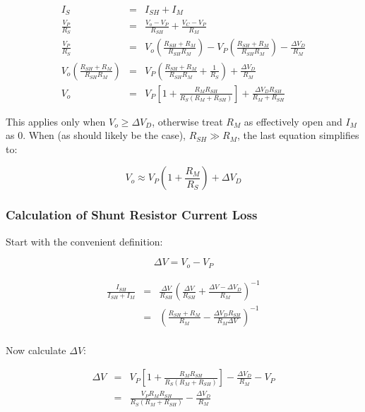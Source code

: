 \documentclass[../PaulGanssle-Thesis.tex]{subfiles}
\begin{document}
\begin{eqnarray}
I_S & = & I_{SH} + I_{M} \\
\frac{V_P}{R_S} & = & \frac{V_o - V_P}{R_{SH}} + \frac{V_C - V_P}{R_M}\\
\frac{V_P}{R_S} & = & V_o\left(\frac{R_{SH} + R_{M}}{R_{SH}R_{M}}\right) - V_P\left(\frac{R_{SH} + R_{M}}{R_{SH}R_{M}}\right) - \frac{\Delta V_D}{R_{M}} \\
V_o\left(\frac{R_{SH} + R_{M}}{R_{SH}R_{M}}\right) & = & V_P\left(\frac{R_{SH} + R_{M}}{R_{SH}R_{M}} + \frac{1}{R_S}\right) + \frac{\Delta{V_D}}{{R_M}} \\
V_o & = & V_P\left[1 + \frac{R_{M}R_{SH}}{R_S(R_M + R_{SH})}\right] + \frac{\Delta V_D R_{SH}}{R_M + R_{SH}}
\end{eqnarray}

This applies only when $V_o \geq \Delta V_D$, otherwise treat $R_M$ as effectively open and $I_M$ as 0. When (as should likely be the case), $R_{SH} \gg R_M$, the last equation simplifies to:

\begin{equation}
V_o \approx V_P\left(1 + \frac{R_M}{R_S}\right) + \Delta V_D
\end{equation}

\subsubsection{Calculation of Shunt Resistor Current Loss}
\label{proofs.circuits.pulse.shunt}

Start with the convenient definition:

\begin{equation}
\Delta V = V_o - V_P
\end{equation}

\begin{eqnarray}
\frac{I_{SH}}{I_{SH} + I_{M}} & = & \frac{\Delta V}{R_{SH}}\left(\frac{\Delta V}{R_{SH}} + \frac{\Delta V - \Delta V_D}{R_M}\right)^{-1} \\
& = & \left(\frac{R_{SH} + R_M}{R_M} - \frac{\Delta V_{D} R_{SH}}{R_M\Delta V}\right)^{-1} \\
\end{eqnarray}

Now calculate $\Delta V$:

\begin{eqnarray}
\Delta V & = & V_P\left[1 + \frac{R_MR_{SH}}{R_S(R_M + R_{SH})}\right] - \frac{\Delta V_D}{R_M} - V_P \\
& = & \frac{V_PR_MR_{SH}}{R_S(R_M + R_{SH})} - \frac{\Delta V_D}{R_M}
\end{eqnarray}
\end{document}
